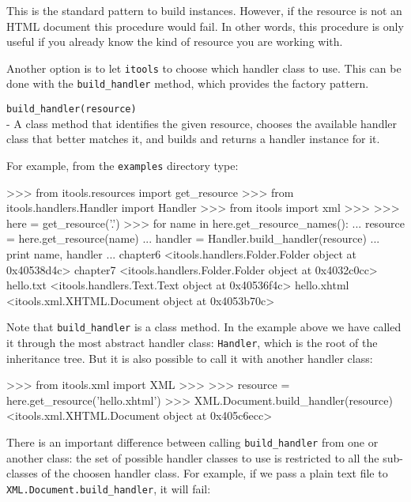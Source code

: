 This is the standard pattern to build instances. However, if the resource
is not an HTML document this procedure would fail. In other words, this
procedure is only useful if you already know the kind of resource you
are working with.

Another option is to let {\tt itools} to choose which handler class to use.
This can be done with the {\tt build\_handler} method, which provides the
factory pattern.

\begin{api}
  {\tt build\_handler(resource)}\\
  - A class method that identifies the given resource, chooses the available
  handler class that better matches it, and builds and returns a handler
  instance for it.
\end{api}

For example, from the {\tt examples} directory type:

\begin{code}
    >>> from itools.resources import get_resource
    >>> from itools.handlers.Handler import Handler
    >>> from itools import xml
    >>> 
    >>> here = get_resource('.')
    >>> for name in here.get_resource_names():
    ...     resource = here.get_resource(name)
    ...     handler = Handler.build_handler(resource)
    ...     print name, handler
    ... 
    chapter6 <itools.handlers.Folder.Folder object at 0x40538d4c>
    chapter7 <itools.handlers.Folder.Folder object at 0x4032c0cc>
    hello.txt <itools.handlers.Text.Text object at 0x40536f4c>
    hello.xhtml <itools.xml.XHTML.Document object at 0x4053b70c>
\end{code}

Note that {\tt build\_handler} is a class method. In the example above
we have called it through the most abstract handler class: {\tt Handler},
which is the root of the inheritance tree. But it is also possible to call
it with another handler class:

\begin{code}
    >>> from itools.xml import XML
    >>> 
    >>> resource = here.get_resource('hello.xhtml')
    >>> XML.Document.build_handler(resource)
    <itools.xml.XHTML.Document object at 0x405c6ecc>
\end{code}

There is an important difference between calling {\tt build\_handler} from
one or another class: the set of possible handler classes to use is
restricted to all the sub-classes of the choosen handler class. For example,
if we pass a plain text file to {\tt XML.Document.build\_handler}, it will
fail:

